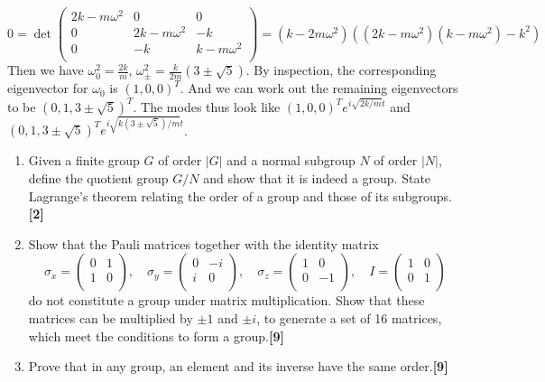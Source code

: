 \documentclass[a4paper]{article}
\begin{document}
\begin{ans}
\begin{enumerate}[label=(\alph*)]
$$0=\det\begin{pmatrix}2k-m\omega^2&0&0\\0&2k-m\omega^2&-k\\0&-k&k-m\omega^2\\\end{pmatrix}=(k-2m\omega^2)((2k-m\omega^2)(k-m\omega^2)-k^2)$$
Then we have $\omega_0^2=\frac{2k}{m}$, $\omega_\pm^2=\frac{k}{2m}(3\pm\sqrt{5})$. By inspection, the corresponding eigenvector for $\omega_0$ is $(1,0,0)^T$. And we can work out the remaining eigenvectors to be $(0,1,3\pm\sqrt{5})^T$. The modes thus look like $(1,0,0)^Te^{i\sqrt{2k/m}t}$ and $(0,1,3\pm\sqrt{5})^Te^{i\sqrt{k(3\pm\sqrt{5})/m}t}$.
\end{enumerate}
\end{ans}
\newpage
\begin{qns}\leavevmode
\begin{enumerate}[label=(\alph*)]
\item Given a finite group $G$ of order $|G|$ and a normal subgroup $N$ of order $|N|$, define the quotient group $G/N$ and show that it is indeed a group. State Lagrange’s theorem relating the order of a group and those of its subgroups.\hfill\textbf{[2]}
\item Show that the Pauli matrices together with the identity matrix
$$\sigma_x=\begin{pmatrix}0&1\\1&0\\\end{pmatrix},\quad\sigma_y=\begin{pmatrix}0&-i\\i&0\\\end{pmatrix},\quad\sigma_z=\begin{pmatrix}1&0\\0&-1\\\end{pmatrix},\quad I=\begin{pmatrix}1&0\\0&1\\\end{pmatrix}$$
do not constitute a group under matrix multiplication. Show that these matrices can be multiplied by $\pm 1$ and $\pm i$, to generate a set of 16 matrices, which meet the conditions to form a group.\hfill\textbf{[9]}
\item Prove that in any group, an element and its inverse have the same order.\hfill\textbf{[9]}
\end{enumerate}
\end{qns}
\end{document}
